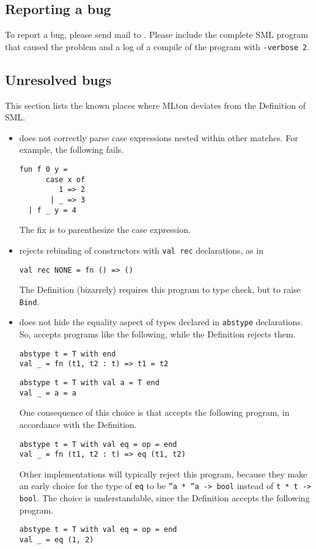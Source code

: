 %
\subsection{Reporting a bug}

To report a bug, please send mail to {\mltonmail}.  Please include the
complete SML program that caused the problem and a log of a compile of
the program with {\tt -verbose 2}.
%
\subsection{Unresolved bugs}

This section lists the known places where MLton deviates from the
Definition of SML.

\begin{itemize}

\item
{\mlton} does not correctly parse case expressions nested within other
matches.  For example, the following fails.
\begin{verbatim}
fun f 0 y =
      case x of
         1 => 2
       | _ => 3
  | f _ y = 4
\end{verbatim}
The fix is to parenthesize the case expression.

\item
{\mlton} rejects rebinding of constructors with {\tt val rec}
declarations, as in
\begin{verbatim}
val rec NONE = fn () => ()
\end{verbatim}
The Definition (bizarrely) requires this program to type check, but to
raise {\tt Bind}.

\item
{\mlton} does not hide the equality aspect of types declared in
{\tt abstype} declarations.  So, {\mlton} accepts programs like the
following, while the Definition rejects them.
\begin{verbatim}
abstype t = T with end
val _ = fn (t1, t2 : t) => t1 = t2
\end{verbatim}

\begin{verbatim}
abstype t = T with val a = T end
val _ = a = a
\end{verbatim}

One consequence of this choice is that {\mlton} accepts the following
program, in accordance with the Definition.
\begin{verbatim}
abstype t = T with val eq = op = end
val _ = fn (t1, t2 : t) => eq (t1, t2)
\end{verbatim}
Other implementations will typically reject this program, because they
make an early choice for the type of {\tt eq} to be {\tt ''a * ''a ->
bool} instead of {\tt t * t -> bool}.  The choice is understandable,
since the Definition accepts the following program.
\begin{verbatim}
abstype t = T with val eq = op = end
val _ = eq (1, 2)
\end{verbatim}

\end{itemize}
